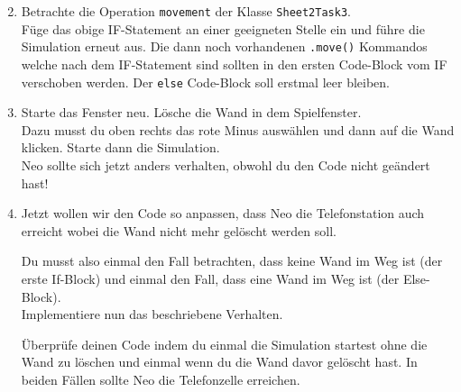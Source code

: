 \begin{enumerate} \setcounter{enumi}{1}
    \item Betrachte die Operation \lstinline{movement} der Klasse \lstinline{Sheet2Task3}.\\
        Füge das obige IF-Statement an einer geeigneten Stelle ein und führe die Simulation erneut aus.
        Die dann noch vorhandenen \lstinline{.move()} Kommandos welche nach dem IF-Statement sind sollten in den ersten Code-Block vom IF verschoben werden.
        Der \lstinline{else} Code-Block soll erstmal leer bleiben.
    \item Starte das Fenster neu.
        Lösche die Wand in dem Spielfenster.\\
        Dazu musst du oben rechts das rote Minus auswählen und dann auf die Wand klicken.
        Starte dann die Simulation.\\
        Neo sollte sich jetzt anders verhalten, obwohl du den Code nicht geändert hast!
    \item Jetzt wollen wir den Code so anpassen, dass Neo die Telefonstation auch erreicht wobei die Wand nicht mehr gelöscht werden soll.

        Du musst also einmal den Fall betrachten, dass keine Wand im Weg ist (der erste If-Block) und einmal den Fall, dass eine Wand im Weg ist (der Else-Block).\\
        Implementiere nun das beschriebene Verhalten.

        Überprüfe deinen Code indem du einmal die Simulation startest ohne die Wand zu löschen und einmal wenn du die Wand davor gelöscht hast.
        In beiden Fällen sollte Neo die Telefonzelle erreichen.

\end{enumerate}

